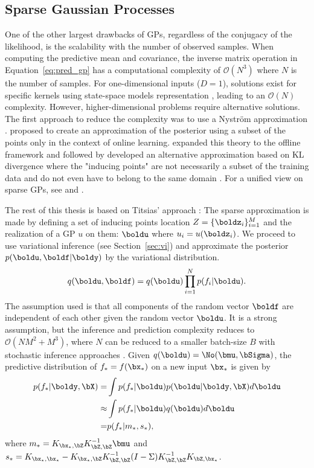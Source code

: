 \subsection{Sparse Gaussian Processes}
\label{sec:sparsegps}
One of the other largest drawbacks of \ac{GPs}, regardless of the conjugacy of the likelihood, is the scalability with the number of observed samples.
When computing the predictive mean and covariance, the inverse matrix operation in Equation~\eqref{eq:pred_gp} has a computational complexity of $\mathcal{O}(N^3)$ where $N$ is the number of samples.
For one-dimensional inputs ($D=1$), solutions exist for specific kernels using state-space models representation \cite{pmlr-v9-turner10a,solinInfiniteHorizonGaussianProcesses2018}, leading to an $\mathcal{O}(N)$ complexity.
However, higher-dimensional problems require alternative solutions.
The first approach to reduce the complexity was to use a Nystr\"om approximation \cite{williams2002observations}.
\citet{csato2002sparse} proposed to create an approximation of the posterior using a subset of the points only in the context of online learning.
\citet{snelsonSparseGaussianProcesses2009} expanded this theory to the offline framework and \citet{csato2002gaussian} followed by \citet{Titsias2009} developed an alternative approximation based on KL divergence where the "inducing points" are not necessarily a subset of the training data and do not even have to belong to the same domain \cite{NIPS2009_5ea1649a, vdw2020framework}.
For a unified view on sparse \ac{GPs}, see \citet{quinonero2005unifying} and \citet{bui2017unifying}.

The rest of this thesis is based on Titsias' approach \cite{Titsias2009}:
The sparse approximation is made by defining a set of inducing points location $Z=\{\boldz_i\}_{i=1}^M$ and the realization of a \ac{GP} $u$ on them: $\boldu$ where $u_i = u(\boldz_i)$.
We proceed to use variational inference (see Section~\ref{sec:vi}) and approximate the posterior $p(\boldu,\boldf|\boldy)$ by the variational distribution.
\begin{align}
    q(\boldu,\boldf) = q(\boldu)\prod_{i=1}^N p(f_i|\boldu).
    \label{eq:titsias_assumption}
\end{align}
The assumption used is that all components of the random vector $\boldf$ are independent of each other given the random vector $\boldu$.
It is a strong assumption, but the inference and prediction complexity reduces to $\mathcal{O}(NM^2 + M^3)$, where $N$ can be reduced to a smaller batch-size $B$ with stochastic inference approaches \cite{Hensman2013, Hensman2015}.
Given $q(\boldu) = \No(\bmu,\bSigma)$, the predictive distribution of $f_*=f(\bx_*)$ on a new input $\bx_*$ is given by
\begin{align*}
    p(f_*|\boldy,\bX) =& \int p(f_*|\boldu) p(\boldu|\boldy,\bX)d\boldu\\
    \approx& \int p(f_*|\boldu) q(\boldu)d\boldu\\
    =& p(f_*|m_*,s_*),
\end{align*}
where $m_* = K_{\bx_*,\bZ} K^{-1}_{\bZ,\bZ} \bmu$ and $s_* = K_{\bx_*,\bx_*} - K_{\bx_*,\bZ}K_{\bZ,\bZ}^{-1}(I - \Sigma) K^{-1}_{\bZ,\bZ}K_{\bZ,\bx_*}$.

